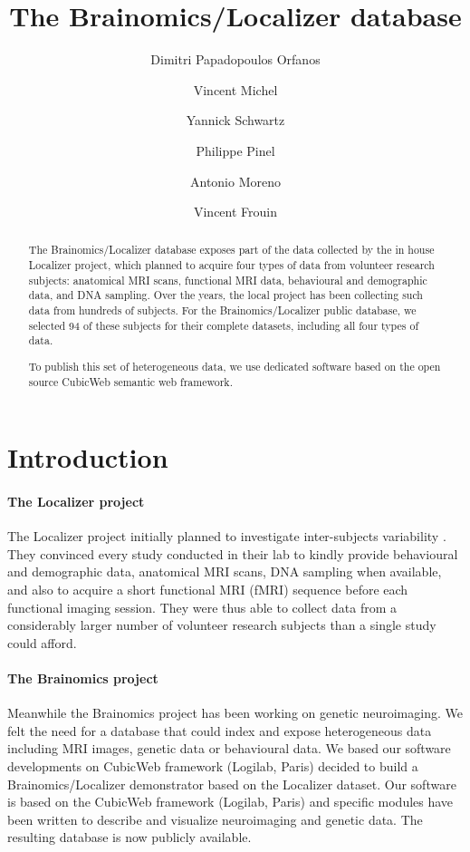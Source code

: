 \documentclass[review]{elsarticle}
\begin{document}
\begin{frontmatter}

\title{The Brainomics/Localizer database}

\author[neurospin]{Dimitri Papadopoulos Orfanos}
\author[logilab]{Vincent Michel}
\author[neurospin]{Yannick Schwartz}
\author[neurospin]{Philippe Pinel}
\author[neurospin]{Antonio Moreno}
\author[neurospin]{Vincent Frouin}

\address[neurospin]{I2BM, Neurospin, CEA/Saclay}
\address[logilab]{Logilab}

\begin{abstract}
The Brainomics/Localizer database exposes part of the data collected by
the in house Localizer project, which planned to acquire four types of
data from volunteer research subjects: anatomical MRI scans, functional MRI
data, behavioural and demographic data, and DNA sampling. Over the years, the
local project has been collecting such data from hundreds of subjects. For the
Brainomics/Localizer public database, we selected 94 of these subjects for their
complete datasets, including all four types of data.

To publish this set of heterogeneous data, we use dedicated software based on
the open source CubicWeb semantic web framework.
\end{abstract}

\end{frontmatter}


\section{Introduction}

\paragraph{The Localizer project} The Localizer project initially planned
to investigate inter-subjects variability \cite{Pinel2007}. They convinced every
study conducted in their lab to kindly provide behavioural and demographic data,
anatomical MRI scans, DNA sampling when available, and also to acquire a short
functional MRI (fMRI) sequence before each functional imaging session. They were
thus able to collect data from a considerably larger number of volunteer research
subjects than a single study could afford. 

\paragraph{The Brainomics project} Meanwhile the Brainomics project has been working on genetic neuroimaging. We felt the need for a database that could index and expose heterogeneous data including MRI images, genetic data or behavioural data. We based our software developments on CubicWeb framework (Logilab, Paris) 
decided to build a Brainomics/Localizer demonstrator based on the Localizer dataset. Our software is based on the CubicWeb framework (Logilab, Paris) and specific modules have been written to describe and visualize neuroimaging and genetic data. The resulting database is now publicly available.
\end{document}
